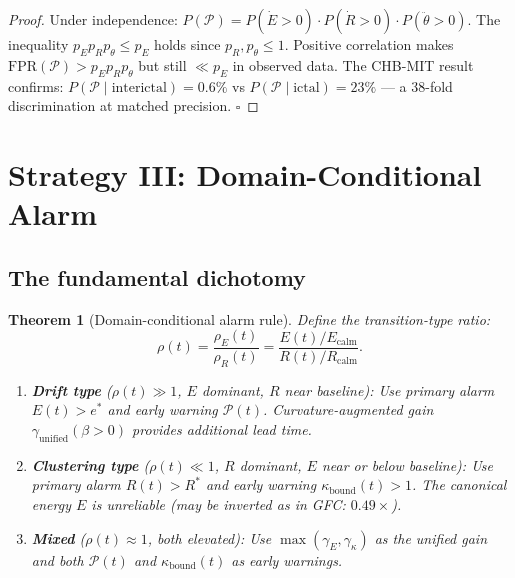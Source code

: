 \documentclass[11pt,a4paper]{article}
\newtheorem{theorem}{Theorem}[section]
\theoremstyle{definition}
\begin{document}
\begin{proof}
Under independence: $P(\mathcal{P}) = P(\dot E>0)\cdot P(\dot R>0)\cdot P(\ddot\theta>0)$.
The inequality $p_E p_R p_\theta \leq p_E$ holds since $p_R,p_\theta \leq 1$.
Positive correlation makes $\mathrm{FPR}(\mathcal{P}) > p_E p_R p_\theta$
but still $\ll p_E$ in observed data.
The CHB-MIT result confirms: $P(\mathcal{P}\;|\;\text{interictal}) = 0.6\%$
vs $P(\mathcal{P}\;|\;\text{ictal}) = 23\%$ --- a 38-fold discrimination
at matched precision. $\square$
\end{proof}

\section{Strategy III: Domain-Conditional Alarm}
\label{sec:domain_conditional}

\subsection{The fundamental dichotomy}

\begin{theorem}[Domain-conditional alarm rule]
\label{thm:domain_alarm}
Define the transition-type ratio:
\[
\rho(t) = \frac{\rho_E(t)}{\rho_R(t)} = \frac{E(t)/E_\mathrm{calm}}{R(t)/R_\mathrm{calm}}.
\]

\begin{enumerate}[label=(\Roman*)]
\item \textbf{Drift type} ($\rho(t) \gg 1$, $E$ dominant, $R$ near baseline):
Use primary alarm $E(t) > e^*$ and early warning $\mathcal{P}(t)$.
Curvature-augmented gain $\gamma_\mathrm{unified}(\beta > 0)$ provides
additional lead time.

\item \textbf{Clustering type} ($\rho(t) \ll 1$, $R$ dominant, $E$ near or below baseline):
Use primary alarm $R(t) > R^*$ and early warning $\kappa_\mathrm{bound}(t) > 1$.
The canonical energy $E$ is unreliable (may be inverted as in GFC: $0.49\times$).

\item \textbf{Mixed} ($\rho(t) \approx 1$, both elevated):
Use $\max(\gamma_E, \gamma_\kappa)$ as the unified gain and
both $\mathcal{P}(t)$ and $\kappa_\mathrm{bound}(t)$ as early warnings.
\end{enumerate}
\end{theorem}
\end{document}
